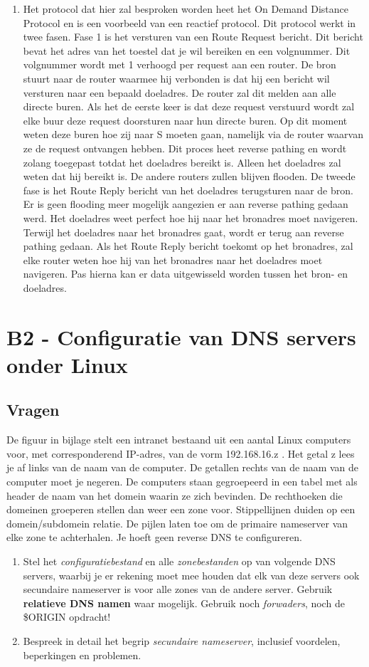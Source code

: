 \documentclass{report}
\begin{document}
\begin{enumerate}
	\item Het protocol dat hier zal besproken worden heet het On Demand Distance Protocol en is een voorbeeld van een reactief protocol. Dit protocol werkt in twee fasen. Fase 1 is het versturen van een Route Request bericht. Dit bericht bevat het adres van het toestel dat je wil bereiken en een volgnummer. Dit volgnummer wordt met 1 verhoogd per request aan een router. De bron stuurt naar de router waarmee hij verbonden is dat hij een bericht wil versturen naar een bepaald doeladres. De router zal dit melden aan alle directe buren. Als het de eerste keer is dat deze request verstuurd wordt zal elke buur deze request doorsturen naar hun directe buren. Op dit moment weten deze buren hoe zij naar S moeten gaan, namelijk via de router waarvan ze de request ontvangen hebben. Dit proces heet reverse pathing en wordt zolang toegepast totdat het doeladres bereikt is. Alleen het doeladres zal weten dat hij bereikt is. De andere routers zullen blijven flooden. De tweede fase is het Route Reply bericht van het doeladres terugsturen naar de bron. Er is geen flooding meer mogelijk aangezien er aan reverse pathing gedaan werd. Het doeladres weet perfect hoe hij naar het bronadres moet navigeren. Terwijl het doeladres naar het bronadres gaat, wordt er terug aan reverse pathing gedaan. Als het Route Reply bericht toekomt op het bronadres, zal elke router weten hoe hij van het bronadres naar het doeladres moet navigeren. Pas hierna kan er data uitgewisseld worden tussen het bron- en doeladres.
	
\end{enumerate}

\newpage
\section{B2 - Configuratie van DNS servers onder Linux}
\subsection{Vragen}
De figuur in bijlage stelt een intranet bestaand uit een aantal Linux computers voor, met corresponderend IP-adres, van de vorm 192.168.16.z . Het getal z lees je af links van de naam van de computer. De getallen rechts van de naam van de computer moet je negeren. De computers staan gegroepeerd in een tabel met als header de naam van het domein waarin ze zich bevinden. De rechthoeken die domeinen groeperen stellen dan weer een zone voor. Stippellijnen duiden op een domein/sub­domein relatie. De pijlen laten toe om de primaire name­server van elke zone te achterhalen. Je hoeft geen reverse DNS te configureren.
\begin{enumerate}
\item Stel het \textit{configuratiebestand} en alle \textit{zonebestanden} op van volgende DNS servers, waarbij je er rekening moet mee houden dat elk van deze servers ook secundaire nameserver is voor alle zones van de andere server. Gebruik \textbf{relatieve DNS namen} waar mogelijk. Gebruik noch \textit{forwaders}, noch de \$ORIGIN opdracht!
\item Bespreek in detail het begrip \textit{secundaire nameserver}, inclusief voordelen, beperkingen en problemen.
\end{enumerate}
\end{document}
